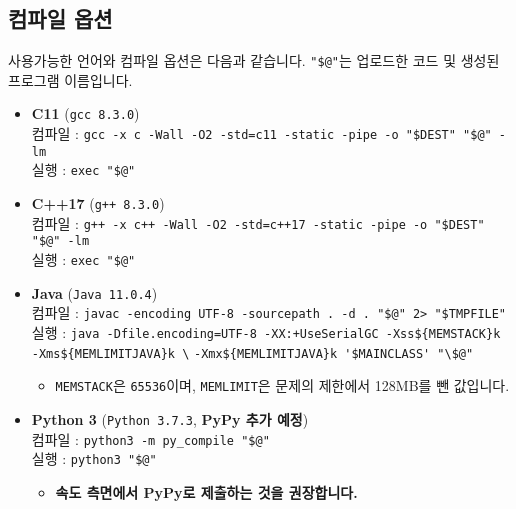 \subsection*{컴파일 옵션}
사용가능한 언어와 컴파일 옵션은 다음과 같습니다. \verb|"$@"|는 업로드한 코드 및 생성된 프로그램 이름입니다.
\begin{itemize}
    \item \textbf{C11} (\texttt{gcc 8.3.0})\\
    컴파일 : \verb|gcc -x c -Wall -O2 -std=c11 -static -pipe -o "$DEST" "$@" -lm|\\
    실행 : \verb|exec "$@"|
    \item \textbf{C++17} (\texttt{g++ 8.3.0})\\
    컴파일 : \verb|g++ -x c++ -Wall -O2 -std=c++17 -static -pipe -o "$DEST" "$@" -lm|\\
    실행 : \verb|exec "$@"|
    \item \textbf{Java} (\texttt{Java 11.0.4})\\
    컴파일 : \verb|javac -encoding UTF-8 -sourcepath . -d . "$@" 2> "$TMPFILE"|\\
    실행 : \verb|java -Dfile.encoding=UTF-8 -XX:+UseSerialGC -Xss${MEMSTACK}k -Xms${MEMLIMITJAVA}k \|
    \verb|-Xmx${MEMLIMITJAVA}k '$MAINCLASS' "\$@"|
    \begin{itemize}
        \item \verb|MEMSTACK|은 \verb|65536|이며, \verb|MEMLIMIT|은 문제의 제한에서 128MB를 뺀 값입니다.
    \end{itemize}
    \item \textbf{Python 3} (\texttt{Python 3.7.3}, {\color{red}\textbf{PyPy 추가 예정}})\\
    컴파일 : \verb|python3 -m py_compile "$@"|\\
    실행 : \verb|python3 "$@"|
    \begin{itemize}
    \item \textbf{속도 측면에서 PyPy로 제출하는 것을 권장합니다.}
    \end{itemize}
\end{itemize}